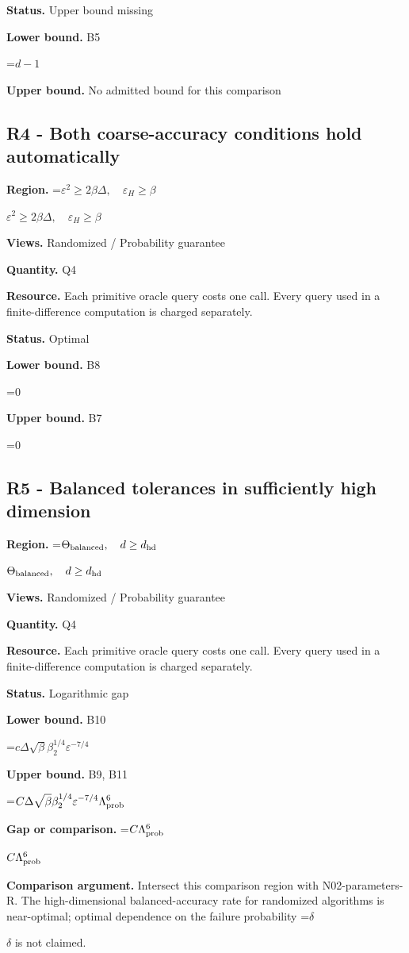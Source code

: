 \documentclass[10pt,a4paper]{article}
\newcommand{\AtlasMath}[1]{\par\begingroup\centering\setbox0=\hbox{$\displaystyle #1$}\ifdim\wd0>1.4\linewidth\typeout{ATLAS WIDE FORMULA: \the\wd0}\fi\ifdim\wd0>\linewidth\resizebox{\linewidth}{!}{\box0}\else\box0\fi\par\endgroup}
\newcommand{\AtlasInlineMath}[1]{\begingroup\setbox0=\hbox{$#1$}\ifdim\wd0>.4\linewidth\endgroup\AtlasMath{#1}\else\endgroup$#1$\fi}
\begin{document}
\textbf{Status.} Upper bound missing

\textbf{Lower bound.} B5

\AtlasMath{d-1}
\textbf{Upper bound.} No admitted bound for this comparison

\subsection{R4 - Both coarse-accuracy conditions hold automatically}
\textbf{Region.} \AtlasInlineMath{\varepsilon^2\ge2\beta\Delta,\quad\varepsilon_H\ge\beta}

\textbf{Views.} Randomized / Probability guarantee

\textbf{Quantity.} Q4

\textbf{Resource.} Each primitive oracle query costs one call. Every query used in a finite-difference computation is charged separately.

\textbf{Status.} Optimal

\textbf{Lower bound.} B8

\AtlasMath{0}
\textbf{Upper bound.} B7

\AtlasMath{0}
\subsection{R5 - Balanced tolerances in sufficiently high dimension}
\textbf{Region.} \AtlasInlineMath{\Theta_{\rm balanced},\quad d\ge d_{\rm hd}}

\textbf{Views.} Randomized / Probability guarantee

\textbf{Quantity.} Q4

\textbf{Resource.} Each primitive oracle query costs one call. Every query used in a finite-difference computation is charged separately.

\textbf{Status.} Logarithmic gap

\textbf{Lower bound.} B10

\AtlasMath{c\Delta\sqrt\beta\beta_2^{1/4}\varepsilon^{-7/4}}
\textbf{Upper bound.} B9, B11

\AtlasMath{C\Delta\sqrt\beta\beta_2^{1/4}\varepsilon^{-7/4}\Lambda_{\rm prob}^6}
\textbf{Gap or comparison.} \AtlasInlineMath{C\Lambda_{\rm prob}^6}

\textbf{Comparison argument.} Intersect this comparison region with N02-parameters-R. The high-dimensional balanced-accuracy rate for randomized algorithms is near-optimal; optimal dependence on the failure probability \AtlasInlineMath{\delta} is not claimed.
\end{document}
